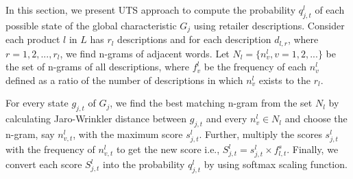 In this section, we present UTS approach to compute the probability $q^{l}_{j,t}$ of each possible state of the global characteristic $G_j$ using retailer descriptions.
Consider each product $l$ in $L$ has $r_l$ descriptions and %
for each description $d_{l,r}$, where $r=1,2,..., r_l$, we find n-grams of adjacent words. Let $N_{l} = \{ n^l_{v}, v=1,2,...\}$ be the set of n-grams of all descriptions, where $f^l_{v}$ be the frequency of each $n^l_{v}$ defined as a ratio of the number of descriptions in which $n^l_{v}$ exists to the $r_l$.

For every state $g_{j,t}$ of $G_j$, we find the best matching n-gram from the set $N_l$ by calculating Jaro-Wrinkler distance between $g_{j,t}$ and every $n^l_v \in N_l$ and choose the n-gram, say $n^l_{v,t}$, with the maximum score $s^l_{j,t}$.  
Further, multiply the scores $s^l_{j,t}$ with the frequency of $n^l_{v,t}$ to get the new score i.e., $S^{l}_{j,t} = s^{l}_{j,t} \times f^s_{l,t}$.
Finally, we convert each score $S^{l}_{j,t}$ into the probability $q^{l}_{j,t}$ by using softmax scaling function.

